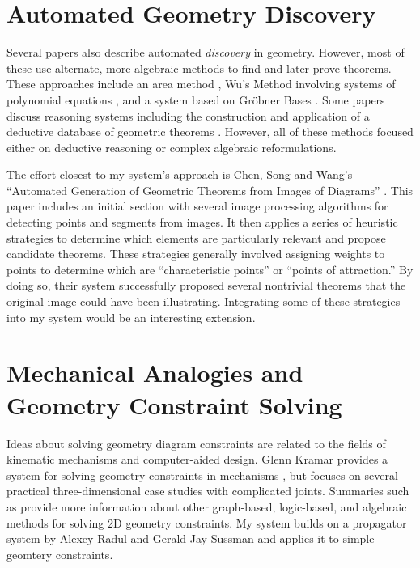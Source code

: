 \section{Automated Geometry Discovery}
Several papers also describe automated \emph{discovery} in
geometry. However, most of these use alternate, more algebraic methods
to find and later prove theorems.  These approaches include an area
method \cite{autoTools}, Wu's Method involving systems of polynomial
equations \cite{wuMethod}, and a system based on Gr\"obner Bases
\cite{grobner}.  Some papers discuss reasoning systems including the
construction and application of a deductive database of geometric
theorems \cite{deductiveDatabase}.  However, all of these methods
focused either on deductive reasoning or complex algebraic
reformulations.

The effort closest to my system's approach is Chen, Song and Wang's
``Automated Generation of Geometric Theorems from Images of Diagrams''
\cite{fromImages}. This paper includes an initial section with several
image processing algorithms for detecting points and segments from
images. It then applies a series of heuristic strategies to determine
which elements are particularly relevant and propose candidate
theorems. These strategies generally involved assigning weights to
points to determine which are ``characteristic points'' or ``points of
attraction.'' By doing so, their system successfully proposed several
nontrivial theorems that the original image could have been
illustrating.  Integrating some of these strategies into my system
would be an interesting extension.

\section{Mechanical Analogies and Geometry Constraint Solving}

Ideas about solving geometry diagram constraints are related to the
fields of kinematic mechanisms and computer-aided design. Glenn
Kramar provides a system for solving geometry constraints in
mechanisms \cite{kramer1992solving}, but focuses on several practical
three-dimensional case studies with complicated joints. Summaries such
as \cite{joan2009basics} provide more information about other
graph-based, logic-based, and algebraic methods for solving 2D
geometry constraints. My system builds on a propagator system by
Alexey Radul and Gerald Jay Sussman \cite{radul-propagator} and
applies it to simple geomtery constraints.

